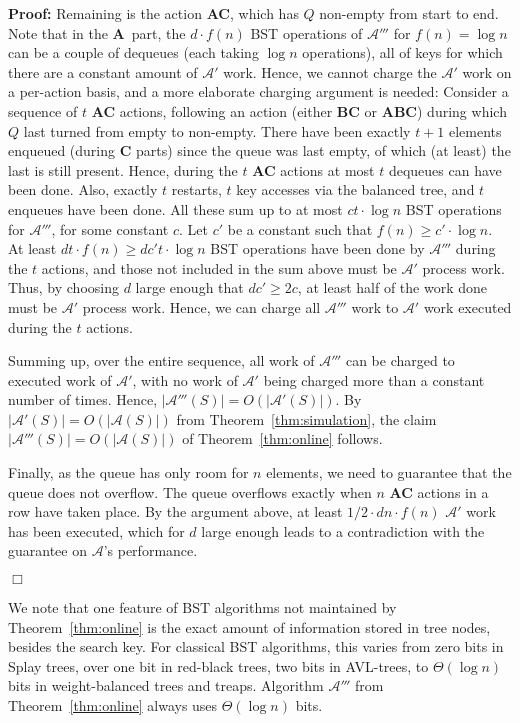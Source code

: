 \documentclass[11pt]{article}
\newenvironment{proof}{\noindent\textbf{Proof: }\ignorespaces}
  {\hspace*{\fill}$\Box$\medskip}
\def\A{{\mathcal{A}}}
\begin{document}
\begin{proof}
Remaining is the action \textbf{AC}, which has $Q$ non-empty from start
to end. Note that in the \textbf{A}~part, the $d\cdot f(n)$ BST
operations of $\A'''$ for $f(n) = \log n$ can be a couple of dequeues
(each taking $\log n$ operations), all of keys for which there are a
constant amount of $\A'$ work. Hence, we cannot charge the $\A'$ work on a
per-action basis, and a more elaborate charging argument is needed:
Consider a sequence of $t$ \textbf{AC} actions, following an action
(either \textbf{BC} or \textbf{ABC}) during which $Q$ last turned from
empty to non-empty. There have been exactly $t+1$ elements enqueued
(during \textbf{C} parts) since the queue was last empty, of which (at
least) the last is still present. Hence, during the $t$ \textbf{AC}
actions at most $t$ dequeues can have been done. Also, exactly $t$
restarts, $t$ key accesses via the balanced tree, and $t$ enqueues have
been done. All these sum up to at most $c t \cdot \log n$ BST operations
for $\A'''$, for some constant $c$. Let $c'$ be a constant such that
$f(n) \ge c' \cdot \log n$. At least $d t \cdot f(n) \ge d c'
t \cdot \log n$ BST operations have been done by $\A'''$ during the
$t$ actions, and those not included in the sum above must be $\A'$
process work. Thus, by choosing $d$ large enough that $d c' \ge
2c$, at least half of the work done must be $\A'$ process work. Hence, we
can charge all $\A'''$ work to $\A'$ work executed during the $t$ actions.

Summing up, over the entire sequence, all work of $\A'''$ can be charged
to executed work of $\A'$, with no work of $\A'$ being charged more than a
constant number of times.  Hence, $|\A'''(S)| = O(|\A'(S)|)$. By
$|\A'(S)| = O(|\A(S)|)$ from Theorem~\ref{thm:simulation}, the claim
$|\A'''(S)| = O(|\A(S)|)$ of Theorem~\ref{thm:online} follows.

Finally, as the queue has only room for $n$ elements, we need to
guarantee that the queue does not overflow. The queue overflows exactly
when $n$ \textbf{AC} actions in a row have taken place. By the argument
above, at least $1/2 \cdot d n \cdot f(n)$ $\A'$ work has been
executed, which for $d$ large enough leads to a contradiction with the
guarantee on $\A$'s performance.

\end{proof}

We note that one feature of BST algorithms not maintained by
Theorem~\ref{thm:online} is the exact amount of information stored in tree
nodes, besides the search key. For classical BST algorithms, this varies
from zero bits in Splay trees, over one bit in red-black trees, two bits in
AVL-trees, to $\Theta(\log n)$ bits in weight-balanced trees and treaps. Algorithm
$\A'''$ from Theorem~\ref{thm:online} always uses $\Theta(\log n)$ bits.





\end{document}
